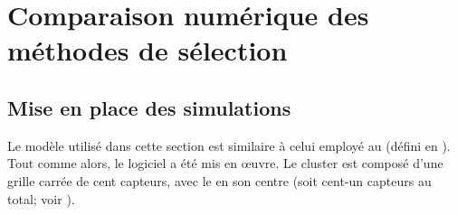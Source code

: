 \section{Comparaison numérique des méthodes de sélection}

    \subsection{Mise en place des simulations}


Le modèle utilisé dans cette section est similaire à celui employé au  (défini en ).
Tout comme alors, le logiciel \nsii a été mis en œuvre.
Le cluster est composé d'une grille carrée de cent capteurs, avec le \ch en son centre (soit cent-un capteurs au total; voir ).

